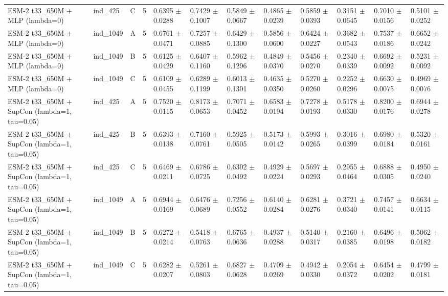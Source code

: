 \begin{table}[ht]
\begin{tabular}{llllllllllll}
ESM-2 t33\_650M + MLP (lambda=0) & ind\_425 & C & 5 & 0.6395 $\pm$ 0.0288 & 0.7429 $\pm$ 0.1007 & 0.5849 $\pm$ 0.0667 & 0.4865 $\pm$ 0.0239 & 0.5859 $\pm$ 0.0393 & 0.3151 $\pm$ 0.0645 & 0.7010 $\pm$ 0.0156 & 0.5101 $\pm$ 0.0252 \\
ESM-2 t33\_650M + MLP (lambda=0) & ind\_1049 & A & 5 & 0.6761 $\pm$ 0.0471 & 0.7257 $\pm$ 0.0885 & 0.6429 $\pm$ 0.1300 & 0.5856 $\pm$ 0.0600 & 0.6424 $\pm$ 0.0227 & 0.3682 $\pm$ 0.0543 & 0.7537 $\pm$ 0.0186 & 0.6652 $\pm$ 0.0242 \\
ESM-2 t33\_650M + MLP (lambda=0) & ind\_1049 & B & 5 & 0.6125 $\pm$ 0.0429 & 0.6407 $\pm$ 0.1160 & 0.5962 $\pm$ 0.1296 & 0.4849 $\pm$ 0.0370 & 0.5456 $\pm$ 0.0270 & 0.2340 $\pm$ 0.0339 & 0.6692 $\pm$ 0.0092 & 0.5231 $\pm$ 0.0092 \\
ESM-2 t33\_650M + MLP (lambda=0) & ind\_1049 & C & 5 & 0.6109 $\pm$ 0.0455 & 0.6289 $\pm$ 0.1199 & 0.6013 $\pm$ 0.1301 & 0.4635 $\pm$ 0.0350 & 0.5270 $\pm$ 0.0260 & 0.2252 $\pm$ 0.0296 & 0.6630 $\pm$ 0.0075 & 0.4969 $\pm$ 0.0076 \\
ESM-2 t33\_650M + SupCon (lambda=1, tau=0.05) & ind\_425 & A & 5 & 0.7520 $\pm$ 0.0115 & 0.8173 $\pm$ 0.0653 & 0.7071 $\pm$ 0.0452 & 0.6583 $\pm$ 0.0194 & 0.7278 $\pm$ 0.0193 & 0.5178 $\pm$ 0.0330 & 0.8200 $\pm$ 0.0176 & 0.6944 $\pm$ 0.0278 \\
ESM-2 t33\_650M + SupCon (lambda=1, tau=0.05) & ind\_425 & B & 5 & 0.6393 $\pm$ 0.0138 & 0.7160 $\pm$ 0.0761 & 0.5925 $\pm$ 0.0505 & 0.5173 $\pm$ 0.0142 & 0.5993 $\pm$ 0.0265 & 0.3016 $\pm$ 0.0399 & 0.6980 $\pm$ 0.0184 & 0.5320 $\pm$ 0.0161 \\
ESM-2 t33\_650M + SupCon (lambda=1, tau=0.05) & ind\_425 & C & 5 & 0.6469 $\pm$ 0.0211 & 0.6786 $\pm$ 0.0725 & 0.6302 $\pm$ 0.0492 & 0.4929 $\pm$ 0.0224 & 0.5697 $\pm$ 0.0293 & 0.2955 $\pm$ 0.0464 & 0.6888 $\pm$ 0.0305 & 0.4950 $\pm$ 0.0240 \\
ESM-2 t33\_650M + SupCon (lambda=1, tau=0.05) & ind\_1049 & A & 5 & 0.6944 $\pm$ 0.0169 & 0.6476 $\pm$ 0.0689 & 0.7256 $\pm$ 0.0552 & 0.6140 $\pm$ 0.0284 & 0.6281 $\pm$ 0.0276 & 0.3721 $\pm$ 0.0340 & 0.7457 $\pm$ 0.0141 & 0.6634 $\pm$ 0.0115 \\
ESM-2 t33\_650M + SupCon (lambda=1, tau=0.05) & ind\_1049 & B & 5 & 0.6272 $\pm$ 0.0214 & 0.5418 $\pm$ 0.0763 & 0.6765 $\pm$ 0.0636 & 0.4937 $\pm$ 0.0288 & 0.5140 $\pm$ 0.0317 & 0.2160 $\pm$ 0.0385 & 0.6496 $\pm$ 0.0198 & 0.5062 $\pm$ 0.0182 \\
ESM-2 t33\_650M + SupCon (lambda=1, tau=0.05) & ind\_1049 & C & 5 & 0.6282 $\pm$ 0.0207 & 0.5261 $\pm$ 0.0803 & 0.6827 $\pm$ 0.0628 & 0.4709 $\pm$ 0.0269 & 0.4942 $\pm$ 0.0330 & 0.2054 $\pm$ 0.0372 & 0.6454 $\pm$ 0.0202 & 0.4799 $\pm$ 0.0181 \\
\hline
\end{tabular}
\end{table}
